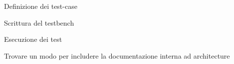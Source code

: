 
\begin{DoxyRefList}
\item[\label{todo__todo000001}%
\hypertarget{todo__todo000001}{}%
Classe \hyperlink{classtruncate_1_1dataflow}{dataflow} ]
\begin{DoxyItemize}
\item Definizione dei test-\/case
\item Scrittura del testbench
\item Esecuzione dei test
\item Trovare un modo per includere la documentazione interna ad architecture 
\end{DoxyItemize}
\end{DoxyRefList}